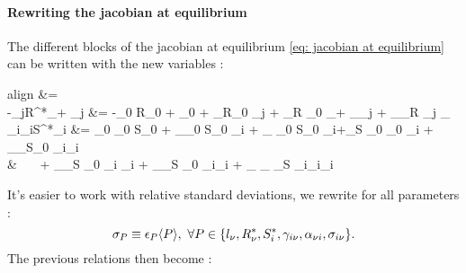 \documentclass[12pt, titlepage, twoside, openright]{report}
\begin{document}
	 \paragraph{Rewriting the jacobian at equilibrium}
	 The different blocks of the jacobian at equilibrium \eqref{eq: jacobian at equilibrium} can be written with the new variables :
	 \begin{empheq}[left=\empheqlbrace]{align}
	  &=  \\
	 -\gamma_{j\mu}R^*_\mu + \alpha_{\mu j} &= -\gamma_0 R_0 + \alpha_0 + \sigma_\gamma R_0 \tilde{\gamma}_{j\mu} + \sigma_R \gamma_0 _\mu + \sigma_\alpha \tilde{\alpha}_{\mu j} + \sigma_\gamma \sigma_R \tilde{\gamma}_{j\mu} _\mu \\
	 \sigma_{i\nu}\gamma_{i\nu}S^*_i &= \sigma_0 \gamma_0 S_0 + \sigma_\sigma \gamma_0 S_0 \tilde{\sigma}_{i\nu} + \sigma_{\gamma} \sigma_0 S_0 \tilde{\gamma}_{i\nu}+\sigma_S \sigma_0 \gamma_0 _i + \sigma_\sigma \sigma_\gamma S_0 \tilde{\sigma}_{i\nu}\tilde{\gamma}_{i\nu} \nonumber \\
	  & \ \ \ + \sigma_\sigma \sigma_S \gamma_0 \tilde{\sigma}_{i\nu} _i + \sigma_\gamma \sigma_S \sigma_0 \tilde{\gamma}_{i\nu}_i + \sigma_{\sigma} \sigma_{\gamma} \sigma_{S} \tilde{\sigma}_{i\nu}\tilde{\gamma}_{i\nu}_i
	 \end{empheq}
	 It's easier to work with relative standard deviations, \ie we rewrite for all parameters :
	 \begin{equation}
	 \sigma_P \equiv \epsilon_P \langle P \rangle, \ \forall P \in\{l_\nu, R^*_\nu, S^*_i, \gamma_{i\nu}, \alpha_{\nu i}, \sigma_{i\nu}\}.
	 \end{equation}
	 The previous relations then become :
\end{document}
